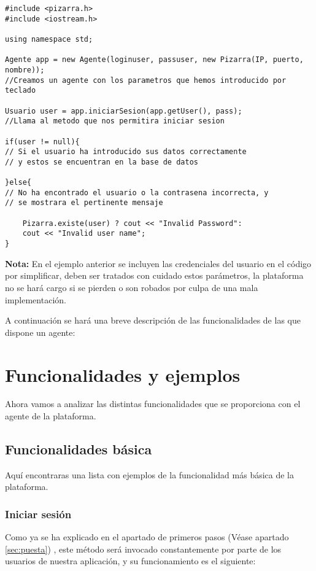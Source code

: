 \begin{lstlisting}
#include <pizarra.h>
#include <iostream.h>

using namespace std;

Agente app = new Agente(loginuser, passuser, new Pizarra(IP, puerto, nombre)); 
//Creamos un agente con los parametros que hemos introducido por teclado

Usuario user = app.iniciarSesion(app.getUser(), pass); 
//Llama al metodo que nos permitira iniciar sesion

if(user != null){ 
// Si el usuario ha introducido sus datos correctamente 
// y estos se encuentran en la base de datos

}else{            
// No ha encontrado el usuario o la contrasena incorrecta, y 
// se mostrara el pertinente mensaje 

    Pizarra.existe(user) ? cout << "Invalid Password":
    cout << "Invalid user name";
}
\end{lstlisting}

\textbf{Nota: }En el ejemplo anterior se incluyen las credenciales del usuario en el código por simplificar, deben ser tratados con cuidado estos parámetros, la plataforma no se hará cargo si se pierden o son robados por culpa de una mala implementación.

A continuación se hará una breve descripción de las funcionalidades de las que dispone un agente:
\section{Funcionalidades y ejemplos}
Ahora vamos a analizar las distintas funcionalidades que se proporciona con el agente de la plataforma.\\
\subsection{Funcionalidades básica}
Aquí encontraras una lista con ejemplos de la funcionalidad más básica de la plataforma.

\subsubsection{Iniciar sesión}
Como ya se ha explicado en el apartado de primeros pasos (Véase apartado \ref{sec:puesta}) , este método será invocado constantemente por parte de los usuarios de nuestra aplicación, y su funcionamiento es el siguiente:\\

